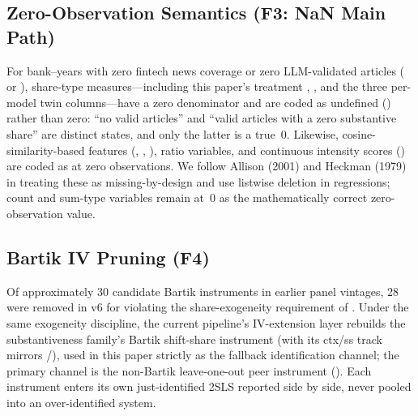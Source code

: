 \subsection{Zero-Observation Semantics (F3: NaN Main Path)}
For bank--years with zero fintech news coverage or zero LLM-validated
articles ( or ),
share-type measures---including this paper's treatment ,
, and the three per-model twin columns---have a zero
denominator and are coded as undefined () rather than zero:
``no valid articles'' and ``valid articles with a zero substantive
share'' are distinct states, and only the latter is a true~$0$.
Likewise, cosine-similarity-based features (,
, ), ratio variables, and
continuous intensity scores () are coded
as  at zero observations. We follow Allison (2001) and
Heckman (1979) in treating these as missing-by-design and use listwise
deletion in regressions; count and sum-type variables remain at~$0$ as
the mathematically correct zero-observation value.

\subsection{Bartik IV Pruning (F4)}
Of approximately 30 candidate Bartik instruments in earlier panel
vintages, 28 were removed in v6 for violating the share-exogeneity
requirement of \textcite{goldsmithpinkham2020bartik}. Under the same
exogeneity discipline, the current pipeline's IV-extension layer
rebuilds the substantiveness family's Bartik shift-share instrument
 (with its ctx/ss track mirrors
/), used in this paper strictly
as the fallback identification channel; the primary channel is the
non-Bartik leave-one-out peer instrument
(). Each instrument enters its
own just-identified 2SLS reported side by side, never pooled into an
over-identified system.

